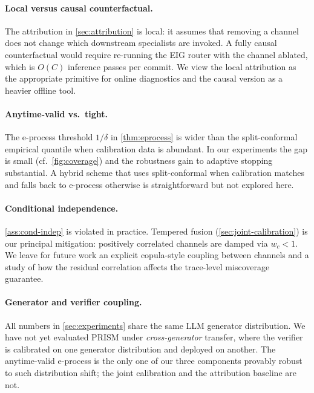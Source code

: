 \documentclass[11pt,a4paper]{article}
\theoremstyle{plain}
\theoremstyle{definition}
\theoremstyle{remark}
\begin{document}
\paragraph{Local versus causal counterfactual.}
The attribution in \cref{sec:attribution} is local: it assumes that
removing a channel does not change which downstream specialists are
invoked. A fully causal counterfactual would require re-running the
EIG router with the channel ablated, which is $O(C)$ inference
passes per commit. We view the local attribution as the appropriate
primitive for online diagnostics and the causal version as a heavier
offline tool.

\paragraph{Anytime-valid vs.\ tight.}
The e-process threshold $1/\delta$ in \cref{thm:eprocess} is wider
than the split-conformal empirical quantile when calibration data is
abundant. In our experiments the gap is small (cf.\
\cref{fig:coverage}) and the robustness gain to adaptive stopping
substantial. A hybrid scheme that uses split-conformal when
calibration matches and falls back to e-process otherwise is
straightforward but not explored here.

\paragraph{Conditional independence.}
\cref{ass:cond-indep} is violated in practice. Tempered fusion
(\cref{sec:joint-calibration}) is our principal mitigation: positively
correlated channels are damped via $w_c < 1$. We leave for future
work an explicit copula-style coupling between channels and a study
of how the residual correlation affects the trace-level miscoverage
guarantee.

\paragraph{Generator and verifier coupling.}
All numbers in \cref{sec:experiments} share the same LLM generator
distribution. We have not yet evaluated PRISM under
\emph{cross-generator} transfer, where the verifier is calibrated on
one generator distribution and deployed on another. The
anytime-valid e-process is the only one of our three components
provably robust to such distribution shift; the joint calibration
and the attribution baseline are not.

\end{document}
